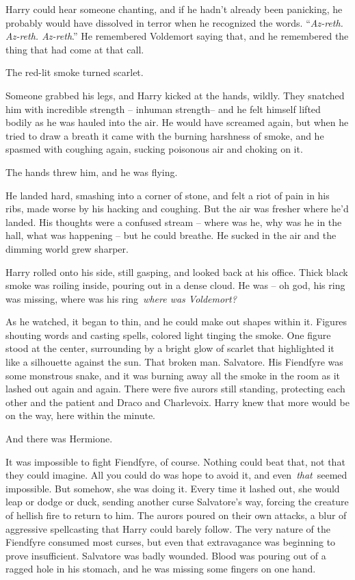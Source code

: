 Harry could hear someone chanting, and if he hadn't already been
panicking, he probably would have dissolved in terror when he recognized
the words. ``\emph{Az-reth. Az-reth. Az-reth}.'' He remembered Voldemort
saying that, and he remembered the thing that had come at that call.

The red-lit smoke turned scarlet.

Someone grabbed his legs, and Harry kicked at the hands, wildly. They
snatched him with incredible strength -- inhuman strength-- and he felt
himself lifted bodily as he was hauled into the air. He would have
screamed again, but when he tried to draw a breath it came with the
burning harshness of smoke, and he spasmed with coughing again, sucking
poisonous air and choking on it.

The hands threw him, and he was flying.

He landed hard, smashing into a corner of stone, and felt a riot of pain
in his ribs, made worse by his hacking and coughing. But the air was
fresher where he'd landed. His thoughts were a confused stream -- where
was he, why was he in the hall, what was happening -- but he could
breathe. He sucked in the air and the dimming world grew sharper.

Harry rolled onto his side, still gasping, and looked back at his
office. Thick black smoke was roiling inside, pouring out in a dense
cloud. He was -- oh god, his ring was missing, where was his
ring~\emph{where was Voldemort?}

As he watched, it began to thin, and he could make out shapes within it.
Figures shouting words and casting spells, colored light tinging the
smoke. One figure stood at the center, surrounding by a bright glow of
scarlet that highlighted it like a silhouette against the sun. That
broken man. Salvatore. His Fiendfyre was some monstrous snake, and it
was burning away all the smoke in the room as it lashed out again and
again. There were five aurors still standing, protecting each other and
the patient and Draco and Charlevoix. Harry knew that more would be on
the way, here within the minute.

And there was Hermione.

It was impossible to fight Fiendfyre, of course. Nothing could beat
that, not that they could imagine. All you could do was hope to avoid
it, and even~\emph{that}~seemed impossible. But somehow, she was doing
it. Every time it lashed out, she would leap or dodge or duck, sending
another curse Salvatore's way, forcing the creature of hellish fire to
return to him. The aurors poured on their own attacks, a blur of
aggressive spellcasting that Harry could barely follow. The very nature
of the Fiendfyre consumed most curses, but even that extravagance was
beginning to prove insufficient. Salvatore was badly wounded. Blood was
pouring out of a ragged hole in his stomach, and he was missing some
fingers on one hand.

